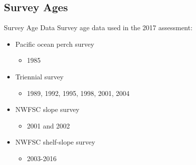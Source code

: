 \documentclass[pdf]{beamer}\usepackage[]{graphicx}\usepackage[]{color}
\begin{document}
\subsection{Survey Ages}
\begin{frame}{Survey Age Data}
  Survey age data used in the 2017 assessment:
  \begin{itemize}
    \item Pacific ocean perch survey
      \begin{itemize}
        \item 1985
      \end{itemize}
    \item Triennial survey
      \begin{itemize}
        \item 1989, 1992, 1995, 1998, 2001, 2004
      \end{itemize}
    \item NWFSC slope survey
      \begin{itemize}
        \item 2001 and 2002
      \end{itemize}
    \item NWFSC shelf-slope survey
      \begin{itemize}
        \item 2003-2016
      \end{itemize}
  \end{itemize}
\end{frame}
\end{document}
